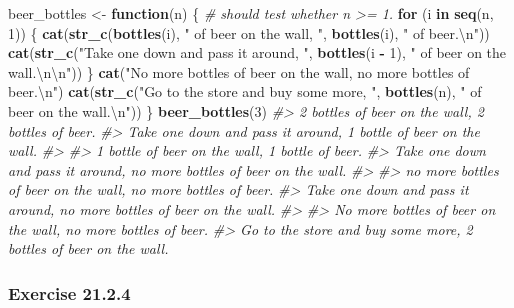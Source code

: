 \documentclass[]{book}
\newenvironment{Shaded}{\begin{snugshade}}{\end{snugshade}}
\newcommand{\CharTok}[1]{\textcolor[rgb]{0.31,0.60,0.02}{#1}}
\newcommand{\CommentTok}[1]{\textcolor[rgb]{0.56,0.35,0.01}{\textit{#1}}}
\newcommand{\ControlFlowTok}[1]{\textcolor[rgb]{0.13,0.29,0.53}{\textbf{#1}}}
\newcommand{\DecValTok}[1]{\textcolor[rgb]{0.00,0.00,0.81}{#1}}
\newcommand{\KeywordTok}[1]{\textcolor[rgb]{0.13,0.29,0.53}{\textbf{#1}}}
\newcommand{\NormalTok}[1]{#1}
\newcommand{\OperatorTok}[1]{\textcolor[rgb]{0.81,0.36,0.00}{\textbf{#1}}}
\newcommand{\StringTok}[1]{\textcolor[rgb]{0.31,0.60,0.02}{#1}}
\theoremstyle{plain}
\theoremstyle{remark}
\begin{document}
\begin{enumerate}
\begin{Shaded}
\begin{Highlighting}[]
\NormalTok{beer_bottles <-}\StringTok{ }\ControlFlowTok{function}\NormalTok{(n) \{}
  \CommentTok{# should test whether n >= 1.}
  \ControlFlowTok{for}\NormalTok{ (i }\ControlFlowTok{in} \KeywordTok{seq}\NormalTok{(n, }\DecValTok{1}\NormalTok{)) \{}
     \KeywordTok{cat}\NormalTok{(}\KeywordTok{str_c}\NormalTok{(}\KeywordTok{bottles}\NormalTok{(i), }\StringTok{" of beer on the wall, "}\NormalTok{, }\KeywordTok{bottles}\NormalTok{(i), }\StringTok{" of beer.}\CharTok{\textbackslash{}n}\StringTok{"}\NormalTok{))}
     \KeywordTok{cat}\NormalTok{(}\KeywordTok{str_c}\NormalTok{(}\StringTok{"Take one down and pass it around, "}\NormalTok{, }\KeywordTok{bottles}\NormalTok{(i }\OperatorTok{-}\StringTok{ }\DecValTok{1}\NormalTok{),}
                \StringTok{" of beer on the wall.}\CharTok{\textbackslash{}n\textbackslash{}n}\StringTok{"}\NormalTok{))}
\NormalTok{  \}}
  \KeywordTok{cat}\NormalTok{(}\StringTok{"No more bottles of beer on the wall, no more bottles of beer.}\CharTok{\textbackslash{}n}\StringTok{"}\NormalTok{)}
  \KeywordTok{cat}\NormalTok{(}\KeywordTok{str_c}\NormalTok{(}\StringTok{"Go to the store and buy some more, "}\NormalTok{, }\KeywordTok{bottles}\NormalTok{(n), }\StringTok{" of beer on the wall.}\CharTok{\textbackslash{}n}\StringTok{"}\NormalTok{))}
\NormalTok{\}}
\KeywordTok{beer_bottles}\NormalTok{(}\DecValTok{3}\NormalTok{)}
\CommentTok{#> 2 bottles of beer on the wall, 2 bottles of beer.}
\CommentTok{#> Take one down and pass it around, 1 bottle of beer on the wall.}
\CommentTok{#> }
\CommentTok{#> 1 bottle of beer on the wall, 1 bottle of beer.}
\CommentTok{#> Take one down and pass it around, no more bottles of beer on the wall.}
\CommentTok{#> }
\CommentTok{#> no more bottles of beer on the wall, no more bottles of beer.}
\CommentTok{#> Take one down and pass it around, no more bottles of beer on the wall.}
\CommentTok{#> }
\CommentTok{#> No more bottles of beer on the wall, no more bottles of beer.}
\CommentTok{#> Go to the store and buy some more, 2 bottles of beer on the wall.}
\end{Highlighting}
\end{Shaded}
\end{enumerate}

\hypertarget{exercise-21.2.4}{%
\subsubsection*{\texorpdfstring{Exercise
{21.2.4}}{Exercise 21.2.4}}\label{exercise-21.2.4}}
\end{document}
